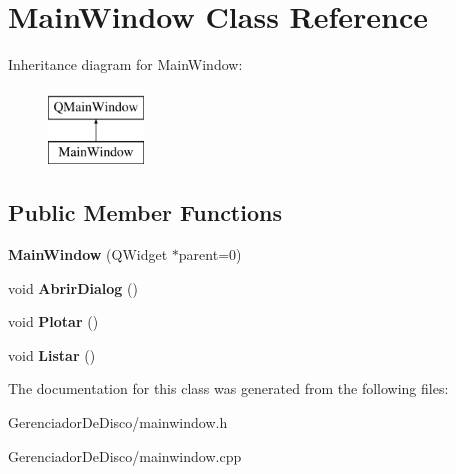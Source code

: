 \hypertarget{classMainWindow}{}\section{Main\+Window Class Reference}
\label{classMainWindow}
Inheritance diagram for Main\+Window\+:\begin{figure}[H]
\begin{center}
\leavevmode
\includegraphics[height=2.000000cm]{classMainWindow}
\end{center}
\end{figure}
\subsection*{Public Member Functions}
\begin{DoxyCompactItemize}
\item 
\hypertarget{classMainWindow_a8b244be8b7b7db1b08de2a2acb9409db}{}{\bfseries Main\+Window} (Q\+Widget $\ast$parent=0)\label{classMainWindow_a8b244be8b7b7db1b08de2a2acb9409db}

\item 
\hypertarget{classMainWindow_a7c2ac5ce98b2a5de2928e730e48dcfd0}{}void {\bfseries Abrir\+Dialog} ()\label{classMainWindow_a7c2ac5ce98b2a5de2928e730e48dcfd0}

\item 
\hypertarget{classMainWindow_aa878ce12d90414ed30463be34b4eea91}{}void {\bfseries Plotar} ()\label{classMainWindow_aa878ce12d90414ed30463be34b4eea91}

\item 
\hypertarget{classMainWindow_a03c52e9b3a28c1d17a82a4346468e050}{}void {\bfseries Listar} ()\label{classMainWindow_a03c52e9b3a28c1d17a82a4346468e050}

\end{DoxyCompactItemize}


The documentation for this class was generated from the following files\+:\begin{DoxyCompactItemize}
\item 
Gerenciador\+De\+Disco/mainwindow.\+h\item 
Gerenciador\+De\+Disco/mainwindow.\+cpp\end{DoxyCompactItemize}
